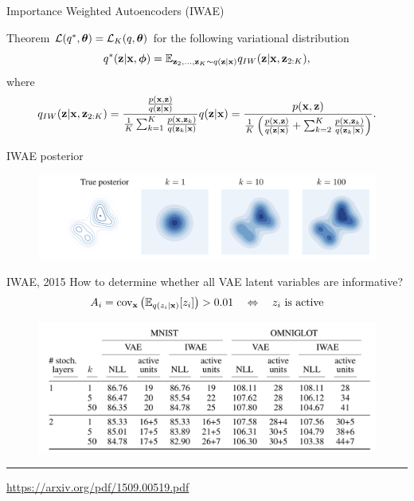 \documentclass{beamer}
\begin{document}
\begin{frame}{Importance Weighted Autoencoders (IWAE)}
	\begin{block}{Theorem}
		$\mathcal{L}(q^*, \boldsymbol{\theta}) = \mathcal{L}_K(q, \boldsymbol{\theta})$
		for the following variational distribution
		\[
		q^*(\mathbf{z} | \mathbf{x}, \boldsymbol{\phi}) = \mathbb{E}_{\mathbf{z}_2, \dots, \mathbf{z}_K \sim q(\mathbf{z} | \mathbf{x})} q_{IW}(\mathbf{z} | \mathbf{x}, \mathbf{z}_{2:K}),
		\]
		where
		\vspace{-0.4cm}
		\[
			q_{IW}(\mathbf{z} | \mathbf{x}, \mathbf{z}_{2:K}) = \frac{\frac{p(\mathbf{x}, \mathbf{z})}{q(\mathbf{z} | \mathbf{x})}}{\frac{1}{K} \sum_{k=1}^K \frac{p(\mathbf{x}, \mathbf{z}_k)}{q(\mathbf{z}_k | \mathbf{x})}} q(\mathbf{z} | \mathbf{x}) = \frac{p(\mathbf{x}, \mathbf{z})}{\frac{1}{K}\left( \frac{p(\mathbf{x}, \mathbf{z})}{q(\mathbf{z} | \mathbf{x})} + \sum_{k=2}^K \frac{p(\mathbf{x}, \mathbf{z}_k)}{q(\mathbf{z}_k | \mathbf{x})}\right)}.
		\]
	\end{block}
	\vspace{-0.5cm}
	\begin{block}{IWAE posterior}
		\vspace{-0.3cm}
		\begin{figure}
			\centering
			\includegraphics[width=\linewidth]{figs/IWAE_1.png}
		\end{figure}
	\end{block}

\end{frame}
\begin{frame}{IWAE, 2015}
	How to determine whether all VAE latent variables are informative?
	\[
	A_{i} = \text{cov}_{\mathbf{x}} \left( \mathbb{E}_{q(z_i | \mathbf{x})} [z_i] \right) > 0.01 \quad \Leftrightarrow \quad z_i \text{ is active}
	\]
	\begin{figure}
		\centering
		\includegraphics[width=\linewidth]{figs/IWAE_3.png}
	\end{figure}
	\vfill
	\hrule\medskip
	{\scriptsize \href{https://arxiv.org/pdf/1509.00519.pdf}{https://arxiv.org/pdf/1509.00519.pdf}}
\end{frame}
\end{document}
